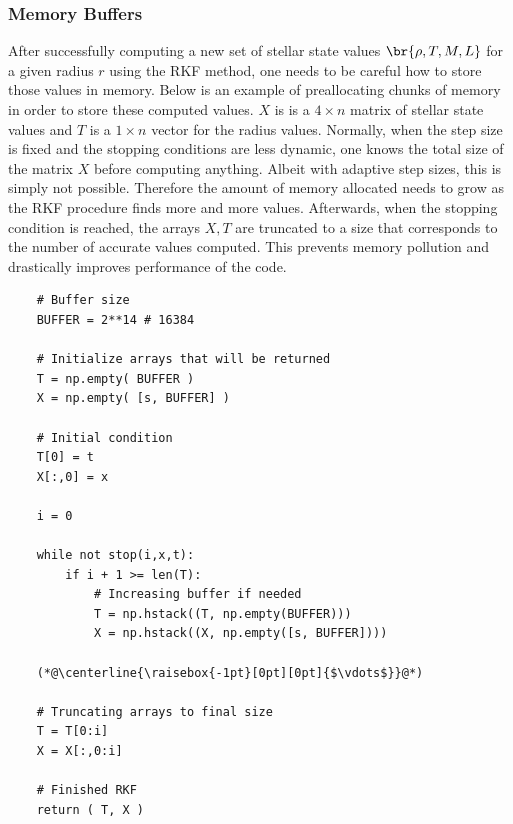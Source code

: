 \documentclass[11pt]{article}
\begin{document}
    \subsubsection{Memory Buffers}
    After successfully computing a new set of stellar state values $\br{\rho,T,M,L}$ for a given radius $r$ using the RKF method, one needs to be careful how to store those values in memory. Below is an example of preallocating chunks of memory in order to store these computed values. $X$ is is a $4\times n$ matrix of stellar state values and $T$ is a $1\times n$ vector for the radius values. Normally, when the step size is fixed and the stopping conditions are less dynamic, one knows the total size of the matrix $X$ before computing anything. Albeit with adaptive step sizes, this is simply not possible. Therefore the amount of memory allocated needs to grow as the RKF procedure finds more and more values. Afterwards, when the stopping condition is reached, the arrays $X,T$ are truncated to a size that corresponds to the number of accurate values computed. This prevents memory pollution and drastically improves performance of the code.
    \begin{lstlisting}
    # Buffer size
    BUFFER = 2**14 # 16384

    # Initialize arrays that will be returned
    T = np.empty( BUFFER )
    X = np.empty( [s, BUFFER] )

    # Initial condition
    T[0] = t
    X[:,0] = x

    i = 0

    while not stop(i,x,t):
        if i + 1 >= len(T):
            # Increasing buffer if needed
            T = np.hstack((T, np.empty(BUFFER)))
            X = np.hstack((X, np.empty([s, BUFFER])))

    (*@\centerline{\raisebox{-1pt}[0pt][0pt]{$\vdots$}}@*)

    # Truncating arrays to final size
    T = T[0:i]
    X = X[:,0:i]

    # Finished RKF
    return ( T, X )
    \end{lstlisting}
\end{document}
